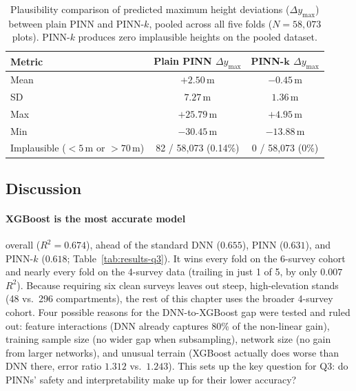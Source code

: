 \documentclass[logo,msc,ai]{infthesis}           %
\begin{document}
\begin{table}[H]
\centering
\scriptsize
\renewcommand{\arraystretch}{0.9}
\setlength{\tabcolsep}{16pt}
\begin{tabular}{lcc}
\toprule
\textbf{Metric} & \textbf{Plain PINN } $\Delta y_{\max}$ & \textbf{PINN-}$ \bm{k}$ $\Delta y_{\max}$ \\
\midrule
Mean                               & $+2.50$\,m             & $-0.45$\,m \\
SD                                 & $7.27$\,m              & $1.36$\,m \\
Max                                & $+25.79$\,m            & $+4.95$\,m \\
Min                                & $-30.45$\,m            & $-13.88$\,m \\
Implausible ($<5$\,m or $>70$\,m)  & 82 / 58,073 (0.14\%)   & 0 / 58,073 (0\%) \\
\bottomrule
\end{tabular}
\caption{\footnotesize{Plausibility comparison of predicted maximum height deviations ($\Delta y_{\max}$) between plain PINN and PINN-$k$, pooled across all five folds ($N=58{,}073$ plots). PINN-$k$ produces zero implausible heights on the pooled dataset.}}
\label{tab:plausibility-comparison}
\end{table}

\subsection*{Discussion}
\paragraph*{XGBoost is the most accurate model} overall ($R^2 = 0.674$), ahead of the standard DNN ($0.655$), PINN ($0.631$), and PINN-$k$ ($0.618$; Table~\ref{tab:results-q3}). It wins every fold on the 6-survey cohort and nearly every fold on the 4-survey data (trailing in just 1 of 5, by only $0.007$ $R^2$). Because requiring six clean surveys leaves out steep, high-elevation stands (48 vs.\ 296 compartments), the rest of this chapter uses the broader 4-survey cohort. Four possible reasons for the DNN-to-XGBoost gap were tested and ruled out: feature interactions (DNN already captures 80\% of the non-linear gain), training sample size (no wider gap when subsampling), network size (no gain from larger networks), and unusual terrain (XGBoost actually does worse than DNN there, error ratio $1.312$ vs.\ $1.243$). This sets up the key question for Q3: do PINNs' safety and interpretability make up for their lower accuracy?
\end{document}
